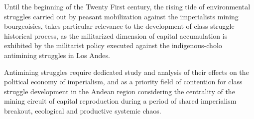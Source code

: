 \documentclass[
]{article}
\begin{document}
Until the beginning of the Twenty First century, the rising tide of
environmental struggles carried out by peasant mobilization against the
imperialists mining bourgeoisies, takes particular relevance to the
development of class struggle historical process, as the militarized
dimension of capital accumulation is exhibited by the militarist policy
executed against the indigenous-cholo antimining struggles in Los Andes.

Antimining struggles require dedicated study and analysis of their
effects on the political economy of imperialism, and as a priority field
of contention for class struggle development in the Andean region
considering the centrality of the mining circuit of capital reproduction
during a period of shared imperialism breakout, ecological and
productive systemic chaos.
\end{document}
